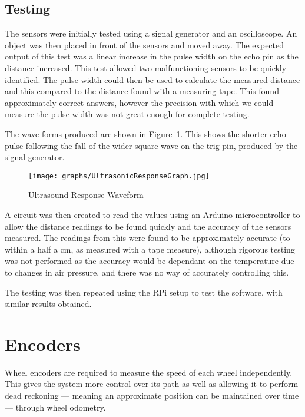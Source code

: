 \subsection{Testing}\label{elec/range/test}
The sensors were initially tested using a signal generator and an
oscilloscope. An object was then placed in front of the sensors
and moved away. The expected output of this test was a linear increase
in the pulse width on the echo pin as the distance
increased. This test allowed two malfunctioning sensors to be quickly identified. The pulse width could then be used to
calculate the measured distance and this compared to the distance
found with a measuring tape. This found approximately correct answers,
however the precision with which we could measure the pulse width was
not great enough for complete testing.

The wave forms produced are shown in Figure~\ref{UltrasoundWaveform}. This shows the shorter echo pulse following the fall of the wider
square wave on the trig pin, produced by the signal generator.

\begin{figure}[!ht]
	\centering
	\texttt{[image: graphs/UltrasonicResponseGraph.jpg]}
	\caption{Ultrasound Response Waveform}\label{UltrasoundWaveform}

\end{figure}

A circuit was then created to read the values using an Arduino
microcontroller to allow the distance readings to be found quickly
and the accuracy of the sensors measured. The readings from this were
found to be approximately accurate (to within a half a \si{\cm},
as measured with a tape measure), although rigorous testing was not
performed as the accuracy would be dependant on the temperature due
to changes in air pressure, and there was no way of accurately controlling this.

The testing was then repeated using the RPi setup to test the
software, with similar results obtained.

\section{Encoders}\label{elec/encoder}
Wheel encoders are required to measure the speed of each wheel
independently. This gives the system more control over its path
as well as allowing it to perform dead reckoning --- meaning an approximate position can be maintained over time --- through wheel odometry.

